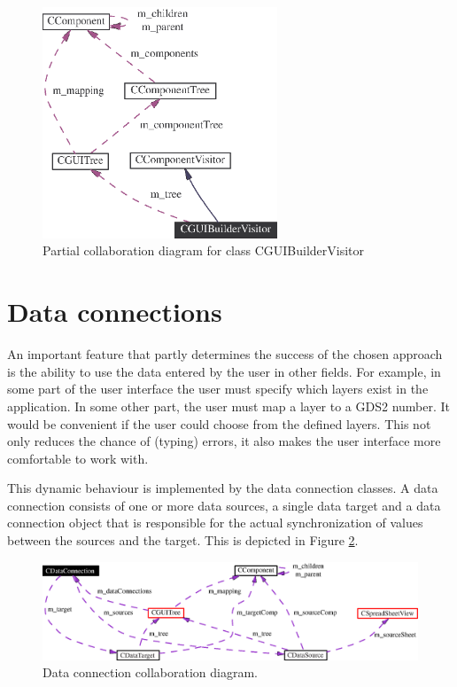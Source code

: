 \begin{figure} \begin{center}
\includegraphics[width=7cm]{./figures/guibuilder_partial.eps}
\caption{Partial collaboration diagram for class CGUIBuilderVisitor}
\label{fig:design:guibuilder_partial}
\end{center} \end{figure}

\section{Data connections} \label{sect:design:dataconnections}
An important feature that partly determines the success of the chosen approach
is the ability to use the data entered by the user in other fields. For
example, in some part of the user interface the user must specify which layers
exist in the application. In some other part, the user must map a layer to a
GDS2 number. It would be convenient if the user could choose from the defined
layers. This not only reduces the chance of (typing) errors, it also makes the
user interface more comfortable to work with.

\bigskip \noindent
This dynamic behaviour is implemented by the data connection classes. A data
connection consists of one or more data sources, a single data target and a
data connection object that is responsible for the actual synchronization of
values between the sources and the target. This is depicted in Figure
\ref{fig:design:dataconnections}.

\begin{figure} \begin{center}
\includegraphics[width=12cm]{./figures/class_cdataconnection_coll_graph.eps}
\caption{Data connection collaboration diagram.}
\label{fig:design:dataconnections}
\end{center} \end{figure}

